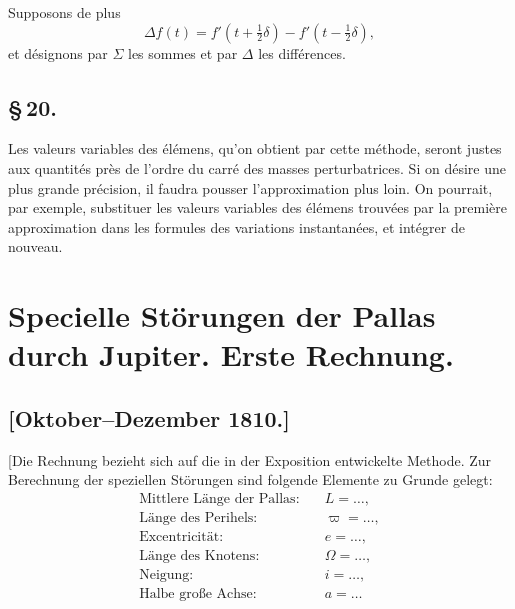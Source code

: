 \documentclass[12pt,a4paper]{article}
\begin{document}
Supposons de plus
\begin{equation}
\Delta f(t) = f'(t + \tfrac{1}{2}\delta) - f'(t - \tfrac{1}{2}\delta), \tag{97}
\end{equation}
et d\'{e}signons par $\Sigma$ les sommes et par $\Delta$ les diff\'{e}rences.

\newpage
\subsection*{\S\,20.}

Les valeurs variables des \'{e}l\'{e}mens, qu'on obtient par cette m\'{e}thode, seront justes aux quantit\'{e}s pr\`{e}s de l'ordre du carr\'{e} des masses perturbatrices. Si on d\'{e}sire une plus grande pr\'{e}cision, il faudra pousser l'approximation plus loin. On pourrait, par exemple, substituer les valeurs variables des \'{e}l\'{e}mens trouv\'{e}es par la premi\`{e}re approximation dans les formules des variations instantan\'{e}es, et int\'{e}grer de nouveau.

\newpage
{}
\section*{Specielle St\"{o}rungen der Pallas durch Jupiter. Erste Rechnung.}

\subsection*{[Oktober--Dezember 1810.]}

[Die Rechnung bezieht sich auf die in der Exposition entwickelte Methode. Zur Berechnung der speziellen St\"{o}rungen sind folgende Elemente zu Grunde gelegt:
\begin{align*}
\text{Mittlere L\"{a}nge der Pallas:} &\quad L = \ldots, \\
\text{L\"{a}nge des Perihels:} &\quad \varpi = \ldots, \\
\text{Excentricit\"{a}t:} &\quad e = \ldots, \\
\text{L\"{a}nge des Knotens:} &\quad \Omega = \ldots, \\
\text{Neigung:} &\quad i = \ldots, \\
\text{Halbe gro\ss{}e Achse:} &\quad a = \ldots
\end{align*}
\end{document}

